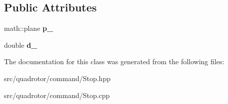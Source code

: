 \subsection*{\-Public \-Attributes}
\begin{DoxyCompactItemize}
\item 
\hypertarget{classCommand_1_1Stop_1_1VCross_a910e3731fbe92e4e2faaed5d3488ac9f}{math\-::plane {\bfseries p\-\_\-}}\label{classCommand_1_1Stop_1_1VCross_a910e3731fbe92e4e2faaed5d3488ac9f}

\item 
\hypertarget{classCommand_1_1Stop_1_1VCross_aa1d7a2990ffcb30d6f4204c4a76959a1}{double {\bfseries d\-\_\-}}\label{classCommand_1_1Stop_1_1VCross_aa1d7a2990ffcb30d6f4204c4a76959a1}

\end{DoxyCompactItemize}


\-The documentation for this class was generated from the following files\-:\begin{DoxyCompactItemize}
\item 
src/quadrotor/command/\-Stop.\-hpp\item 
src/quadrotor/command/\-Stop.\-cpp\end{DoxyCompactItemize}

